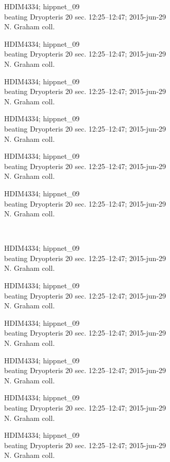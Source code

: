 \documentclass[2pt]{extarticle}
\begin{document}
\noindent
\parbox{0.16\textwidth}{\tiny \raggedright \rule[-0.3\baselineskip]{0pt}{10pt}HDIM4334; hippnet\_09\\ beating Dryopteris 20 sec. 12:25--12:47; 2015-jun-29\\ N. Graham coll.}
\parbox{0.16\textwidth}{\tiny \raggedright \rule[-0.3\baselineskip]{0pt}{10pt}HDIM4334; hippnet\_09\\ beating Dryopteris 20 sec. 12:25--12:47; 2015-jun-29\\ N. Graham coll.}
\parbox{0.16\textwidth}{\tiny \raggedright \rule[-0.3\baselineskip]{0pt}{10pt}HDIM4334; hippnet\_09\\ beating Dryopteris 20 sec. 12:25--12:47; 2015-jun-29\\ N. Graham coll.}
\parbox{0.16\textwidth}{\tiny \raggedright \rule[-0.3\baselineskip]{0pt}{10pt}HDIM4334; hippnet\_09\\ beating Dryopteris 20 sec. 12:25--12:47; 2015-jun-29\\ N. Graham coll.}
\parbox{0.16\textwidth}{\tiny \raggedright \rule[-0.3\baselineskip]{0pt}{10pt}HDIM4334; hippnet\_09\\ beating Dryopteris 20 sec. 12:25--12:47; 2015-jun-29\\ N. Graham coll.}
\parbox{0.16\textwidth}{\tiny \raggedright \rule[-0.3\baselineskip]{0pt}{10pt}HDIM4334; hippnet\_09\\ beating Dryopteris 20 sec. 12:25--12:47; 2015-jun-29\\ N. Graham coll.} \\ 
\vspace{0.001in} 

\noindent
\parbox{0.16\textwidth}{\tiny \raggedright \rule[-0.3\baselineskip]{0pt}{10pt}HDIM4334; hippnet\_09\\ beating Dryopteris 20 sec. 12:25--12:47; 2015-jun-29\\ N. Graham coll.}
\parbox{0.16\textwidth}{\tiny \raggedright \rule[-0.3\baselineskip]{0pt}{10pt}HDIM4334; hippnet\_09\\ beating Dryopteris 20 sec. 12:25--12:47; 2015-jun-29\\ N. Graham coll.}
\parbox{0.16\textwidth}{\tiny \raggedright \rule[-0.3\baselineskip]{0pt}{10pt}HDIM4334; hippnet\_09\\ beating Dryopteris 20 sec. 12:25--12:47; 2015-jun-29\\ N. Graham coll.}
\parbox{0.16\textwidth}{\tiny \raggedright \rule[-0.3\baselineskip]{0pt}{10pt}HDIM4334; hippnet\_09\\ beating Dryopteris 20 sec. 12:25--12:47; 2015-jun-29\\ N. Graham coll.}
\parbox{0.16\textwidth}{\tiny \raggedright \rule[-0.3\baselineskip]{0pt}{10pt}HDIM4334; hippnet\_09\\ beating Dryopteris 20 sec. 12:25--12:47; 2015-jun-29\\ N. Graham coll.}
\parbox{0.16\textwidth}{\tiny \raggedright \rule[-0.3\baselineskip]{0pt}{10pt}HDIM4334; hippnet\_09\\ beating Dryopteris 20 sec. 12:25--12:47; 2015-jun-29\\ N. Graham coll.} \\ 
\vspace{0.001in} 
\end{document}
